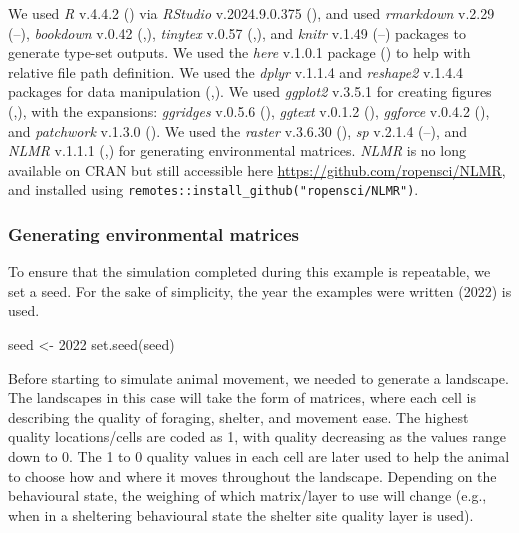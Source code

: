 \documentclass[10pt,a4paper]{article}
\newenvironment{Shaded}{}{}
\newcommand{\DecValTok}[1]{#1}
\newcommand{\FunctionTok}[1]{#1}
\newcommand{\NormalTok}[1]{#1}
\newcommand{\OtherTok}[1]{#1}
\begin{document}
We used \emph{R} v.4.4.2 () via \emph{RStudio} v.2024.9.0.375 (), and used \emph{rmarkdown} v.2.29 (--), \emph{bookdown} v.0.42 (,), \emph{tinytex} v.0.57 (,), and \emph{knitr} v.1.49 (--) packages to generate type-set outputs.
We used the \emph{here} v.1.0.1 package () to help with relative file path definition.
We used the \emph{dplyr} v.1.1.4 and \emph{reshape2} v.1.4.4 packages for data manipulation (,).
We used \emph{ggplot2} v.3.5.1 for creating figures (,), with the expansions: \emph{ggridges} v.0.5.6 (), \emph{ggtext} v.0.1.2 (), \emph{ggforce} v.0.4.2 (), and \emph{patchwork} v.1.3.0 ().
We used the \emph{raster} v.3.6.30 (), \emph{sp} v.2.1.4 (--), and \emph{NLMR} v.1.1.1 (,) for generating environmental matrices. \emph{NLMR} is no long available on CRAN but still accessible here \url{https://github.com/ropensci/NLMR}, and installed using \texttt{remotes::install\_github("ropensci/NLMR")}.

\subsubsection{Generating environmental matrices}\label{generating-environmental-matrices}

To ensure that the simulation completed during this example is repeatable, we set a seed.
For the sake of simplicity, the year the examples were written (2022) is used.

\begin{Shaded}
\begin{Highlighting}[]
\NormalTok{seed }\OtherTok{\textless{}{-}} \DecValTok{2022}
\FunctionTok{set.seed}\NormalTok{(seed)}
\end{Highlighting}
\end{Shaded}

Before starting to simulate animal movement, we needed to generate a landscape.
The landscapes in this case will take the form of matrices, where each cell is describing the quality of foraging, shelter, and movement ease.
The highest quality locations/cells are coded as 1, with quality decreasing as the values range down to 0.
The 1 to 0 quality values in each cell are later used to help the animal to choose how and where it moves throughout the landscape.
Depending on the behavioural state, the weighing of which matrix/layer to use will change (e.g., when in a sheltering behavioural state the shelter site quality layer is used).
\end{document}
